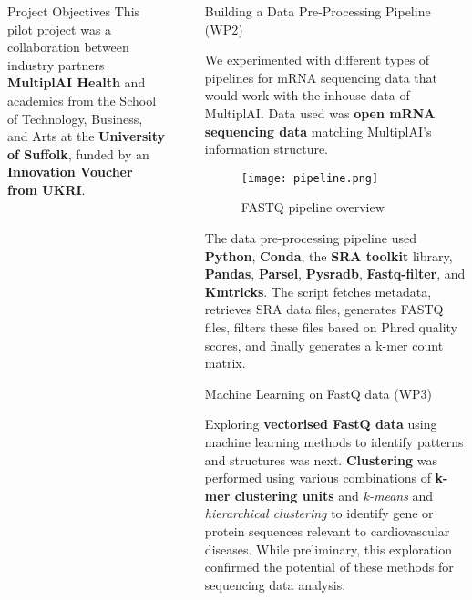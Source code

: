 \documentclass[final]{beamer}
\newlength{\sepwidth}
\newlength{\colwidth}
\newcommand{\separatorcolumn}{\begin{column}{\sepwidth}\end{column}}
\begin{document}
\begin{frame}[t]
\begin{columns}[t]
\begin{column}{\colwidth}
\begin{block}{Project Objectives}
This pilot project was a collaboration between industry partners \textbf{MultiplAI Health} and academics from the School of Technology, Business, and Arts at the \textbf{University of Suffolk}, funded by an \textbf{Innovation Voucher from UKRI}.

  \end{block}



\end{column}



\separatorcolumn

\begin{column}{\colwidth}
 \begin{block}{Building a Data Pre-Processing Pipeline (WP2)}

    We experimented with different types of pipelines for mRNA sequencing data that would work with the inhouse data of MultiplAI. Data used was \textbf{open mRNA sequencing data} matching MultiplAI's information structure. 

    \begin{figure}
        \centering
        \texttt{[image: pipeline.png]}
        \caption{FASTQ pipeline overview}
        \label{fig:pipeline-overview}
    \end{figure}

     The data pre-processing pipeline used \textbf{Python}, \textbf{Conda}, the \textbf{SRA toolkit} library, \textbf{Pandas}, \textbf{Parsel}, \textbf{Pysradb}, \textbf{Fastq-filter}, and \textbf{Kmtricks}. The script fetches metadata, retrieves SRA data files, generates FASTQ files, filters these files based on Phred quality scores, and finally generates a k-mer count matrix.

  \end{block}

      \begin{block}{Machine Learning on FastQ data (WP3)}

    Exploring \textbf{vectorised FastQ data} using machine learning methods to identify patterns and structures was next. \textbf{Clustering} was performed using various combinations of \textbf{k-mer clustering units} and \textit{k-means} and \textit{hierarchical clustering} to identify gene or protein sequences relevant to cardiovascular diseases. While preliminary, this exploration confirmed the potential of these methods for sequencing data analysis. 

    \end{block}
\end{column}


\end{columns}
\end{frame}
\end{document}

